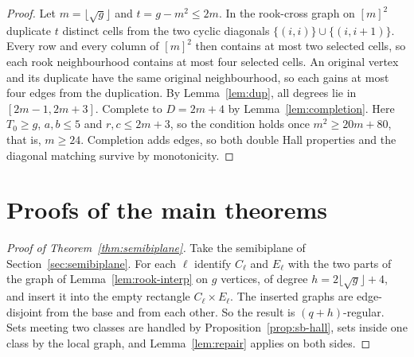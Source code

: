 \documentclass[11pt]{amsart}
\theoremstyle{definition}
\theoremstyle{remark}
\begin{document}
\begin{proof}
Let $m=\lfloor\sqrt g\rfloor$ and $t=g-m^2\le 2m$. In the rook-cross graph on $[m]^2$
duplicate $t$ distinct cells from the two cyclic diagonals $\{(i,i)\}\cup\{(i,i+1)\}$.
Every row and every column of $[m]^2$ then contains at most two selected cells, so each
rook neighbourhood contains at most four selected cells. An original vertex
and its duplicate have the same original neighbourhood, so each gains at most
four edges from the duplication. By Lemma~\ref{lem:dup}, all degrees lie in
$[2m-1,2m+3]$. Complete to $D=2m+4$ by Lemma~\ref{lem:completion}. Here $T_0\ge g$,
$a,b\le5$ and $r,c\le 2m+3$, so the condition holds once $m^2\ge 20m+80$, that is, $m\ge24$.
Completion adds edges, so both double Hall properties and the diagonal
matching survive by monotonicity.
\end{proof}

\section{Proofs of the main theorems}

\begin{proof}[Proof of Theorem~\ref{thm:semibiplane}]
Take the semibiplane of Section~\ref{sec:semibiplane}. For each $\ell$ identify $C_\ell$ and
$E_\ell$ with the two parts of the graph of Lemma~\ref{lem:rook-interp} on $g$ vertices,
of degree $h=2\lfloor\sqrt g\rfloor+4$, and insert it into the empty rectangle
$C_\ell\times E_\ell$. The inserted graphs are edge-disjoint from the base and from each
other. So the result is $(q+h)$-regular. Sets meeting two classes are handled by
Proposition~\ref{prop:sb-hall}, sets inside one class by the local graph, and
Lemma~\ref{lem:repair} applies on both sides.
\end{proof}
\end{document}
